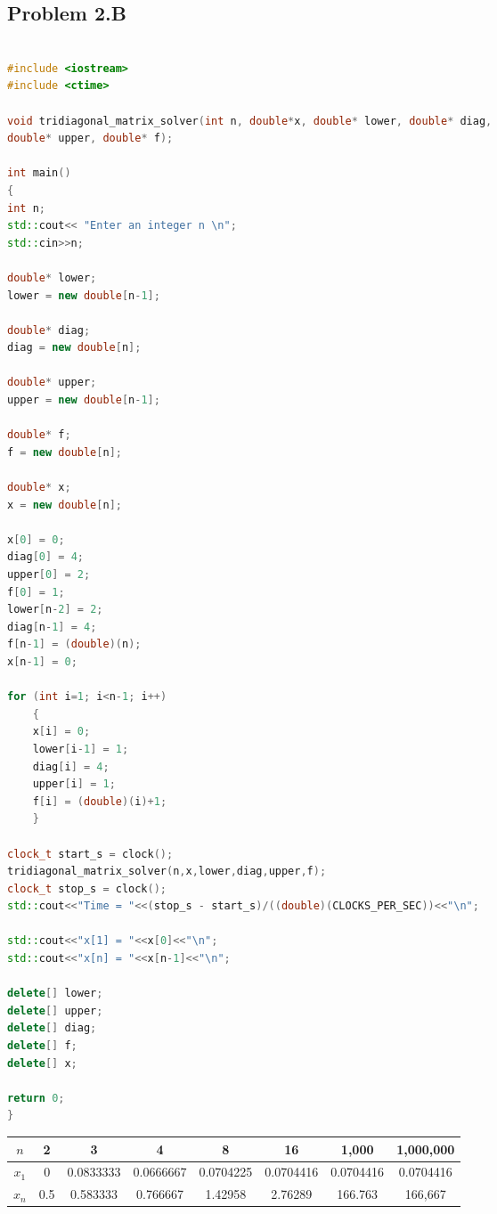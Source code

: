\documentclass[a4paper,12pt,onecolumn,final]{article}
\begin{document}
\subsection*{Problem 2.B}
\begin{center}

\begin{lstlisting}[language=C++]

#include <iostream>
#include <ctime>

void tridiagonal_matrix_solver(int n, double*x, double* lower, double* diag, 
double* upper, double* f);

int main()
{
int n;
std::cout<< "Enter an integer n \n";
std::cin>>n;

double* lower;
lower = new double[n-1];

double* diag;
diag = new double[n];

double* upper;
upper = new double[n-1];

double* f;
f = new double[n];

double* x;
x = new double[n];

x[0] = 0;
diag[0] = 4;
upper[0] = 2;
f[0] = 1;
lower[n-2] = 2;
diag[n-1] = 4;
f[n-1] = (double)(n);
x[n-1] = 0;

for (int i=1; i<n-1; i++)
    {
    x[i] = 0;
    lower[i-1] = 1;
    diag[i] = 4;
    upper[i] = 1;
    f[i] = (double)(i)+1;
    }

clock_t start_s = clock();
tridiagonal_matrix_solver(n,x,lower,diag,upper,f);
clock_t stop_s = clock();
std::cout<<"Time = "<<(stop_s - start_s)/((double)(CLOCKS_PER_SEC))<<"\n";

std::cout<<"x[1] = "<<x[0]<<"\n";
std::cout<<"x[n] = "<<x[n-1]<<"\n";

delete[] lower;
delete[] upper;
delete[] diag;
delete[] f;
delete[] x;

return 0;
}

\end{lstlisting}%


\begin{center}
\begin{tabular}{|c|ccccccc|}
\hline\hline
 $n$ &  2 & 3 & 4 & 8 & 16 & 1,000 & 1,000,000
\\
\hline
 $x_1$ & 0 & 0.0833333 & 0.0666667 & 0.0704225 & 0.0704416 & 0.0704416 & 0.0704416
\\ 
 $x_n$ & 0.5 & 0.583333 & 0.766667 & 1.42958 & 2.76289 & 166.763 & 166,667
\\
\hline\hline
\end{tabular}
\end{center}

\end{center}
\end{document}
